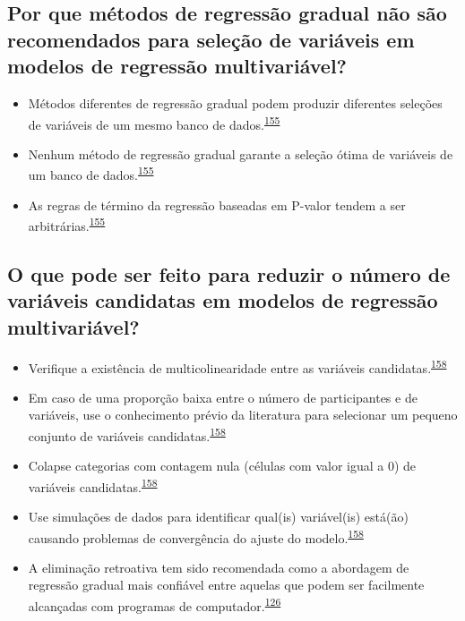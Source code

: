 \documentclass[
  a4paper,
]{book}
\begin{document}
\hypertarget{por-que-muxe9todos-de-regressuxe3o-gradual-nuxe3o-suxe3o-recomendados-para-seleuxe7uxe3o-de-variuxe1veis-em-modelos-de-regressuxe3o-multivariuxe1vel}{%
\subsection{Por que métodos de regressão gradual não são recomendados para seleção de variáveis em modelos de regressão multivariável?}\label{por-que-muxe9todos-de-regressuxe3o-gradual-nuxe3o-suxe3o-recomendados-para-seleuxe7uxe3o-de-variuxe1veis-em-modelos-de-regressuxe3o-multivariuxe1vel}}

\begin{itemize}
\item
  Métodos diferentes de regressão gradual podem produzir diferentes seleções de variáveis de um mesmo banco de dados.\textsuperscript{\protect\hyperlink{ref-Healy1995}{155}}
\item
  Nenhum método de regressão gradual garante a seleção ótima de variáveis de um banco de dados.\textsuperscript{\protect\hyperlink{ref-Healy1995}{155}}
\item
  As regras de término da regressão baseadas em P-valor tendem a ser arbitrárias.\textsuperscript{\protect\hyperlink{ref-Healy1995}{155}}
\end{itemize}

\hypertarget{o-que-pode-ser-feito-para-reduzir-o-nuxfamero-de-variuxe1veis-candidatas-em-modelos-de-regressuxe3o-multivariuxe1vel}{%
\subsection{O que pode ser feito para reduzir o número de variáveis candidatas em modelos de regressão multivariável?}\label{o-que-pode-ser-feito-para-reduzir-o-nuxfamero-de-variuxe1veis-candidatas-em-modelos-de-regressuxe3o-multivariuxe1vel}}

\begin{itemize}
\item
  Verifique a existência de multicolinearidade entre as variáveis candidatas.\textsuperscript{\protect\hyperlink{ref-Sun1996}{158}}
\item
  Em caso de uma proporção baixa entre o número de participantes e de variáveis, use o conhecimento prévio da literatura para selecionar um pequeno conjunto de variáveis candidatas.\textsuperscript{\protect\hyperlink{ref-Sun1996}{158}}
\item
  Colapse categorias com contagem nula (células com valor igual a 0) de variáveis candidatas.\textsuperscript{\protect\hyperlink{ref-Sun1996}{158}}
\item
  Use simulações de dados para identificar qual(is) variável(is) está(ão) causando problemas de convergência do ajuste do modelo.\textsuperscript{\protect\hyperlink{ref-Sun1996}{158}}
\item
  A eliminação retroativa tem sido recomendada como a abordagem de regressão gradual mais confiável entre aquelas que podem ser facilmente alcançadas com programas de computador.\textsuperscript{\protect\hyperlink{ref-heinze2016}{126}}
\end{itemize}
\end{document}
